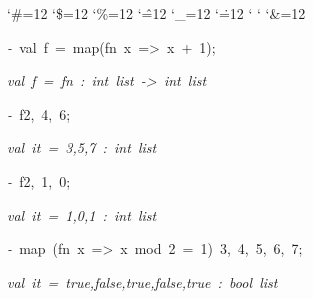 \begin{list}{}
{\setlength{\leftmargin}{\leftmargini}
\setlength{\rightmargin}{0cm}
\setlength{\itemindent}{0cm}
\setlength{\listparindent}{0cm}
\setlength{\itemsep}{0cm}
\setlength{\parsep}{0cm}
\setlength{\labelsep}{0cm}
\setlength{\labelwidth}{0cm}
\catcode`\#=12
\catcode`\$=12
\catcode`\%=12
\catcode`\^=12
\catcode`\_=12
\catcode`\.=12
\catcode`
\catcode`
\catcode`\&=12
\ttfamily}
\small
\item[]\textsl{-\ }val\ f\ =\ map(fn\ x\ =>\ x\ +\ 1);
\item[]\textsl{val\ f\ =\ fn\ :\ int\ list\ ->\ int\ list}
\item[]\textsl{-\ }f2,\ 4,\ 6;
\item[]\textsl{val\ it\ =\ 3,5,7\ :\ int\ list}
\item[]\textsl{-\ }f2,\ 1,\ 0;
\item[]\textsl{val\ it\ =\ 1,0,1\ :\ int\ list}
\item[]\textsl{-\ }map\ (fn\ x\ =>\ x\ mod\ 2\ =\ 1)\ 3,\ 4,\ 5,\ 6,\ 7;
\item[]\textsl{val\ it\ =\ true,false,true,false,true\ :\ bool\ list}
\end{list}
